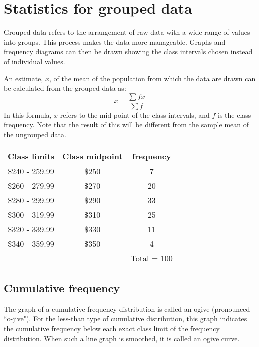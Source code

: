 \documentclass[]{report}
\begin{document}
\section{Statistics for grouped data}
Grouped data refers to the arrangement of raw data with a wide range of values into groups. This process makes the data more manageable. Graphs and frequency diagrams can then be drawn showing the class intervals chosen instead of individual values.


\noindent An estimate, $\bar{x}$, of the mean of the population from which the data are drawn can be calculated from the grouped data as:
\[ \bar{x} = \frac{\sum f x }{\sum f}\]
In this formula, $x$ refers to the mid-point of the class intervals, and $f$ is the class frequency. Note that the result of this will be different from the sample mean of the ungrouped data.


\begin{tabular}{|c|c|c|}
	\hline
	Class limits& Class midpoint & frequency \\
	\hline
	\$240 - 259.99 & \$250 &7\\
	\$260 - 279.99 & \$270 &20\\
	\$280 - 299.99 & \$290 &33\\
	\$300 - 319.99 & \$310 &25\\
	\$320 - 339.99 & \$330 &11\\
	\$340 - 359.99 & \$350 &4\\
	\hline
	& & Total = 100\\
	\hline
\end{tabular}

\subsection{Cumulative frequency}
The graph of a cumulative frequency distribution is called an ogive (pronounced ``o-jive"). For the less-than
type of cumulative distribution, this graph indicates the cumulative frequency below each exact class limit of
the frequency distribution. When such a line graph is smoothed, it is called an ogive curve.
\end{document}
